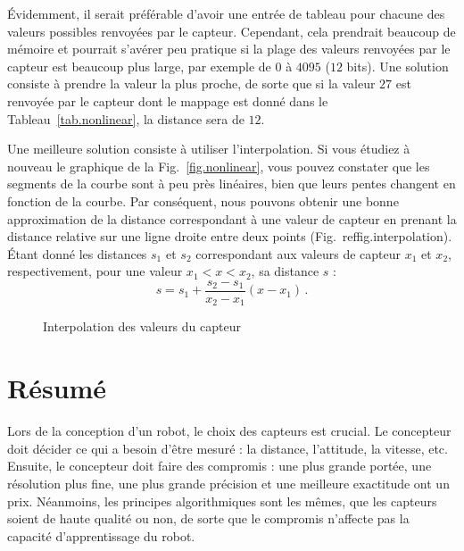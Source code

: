 {Évidemment, il serait préférable d'avoir une entrée de tableau pour chacune des valeurs possibles renvoyées par le capteur. Cependant, cela prendrait beaucoup de mémoire et pourrait s'avérer peu pratique si la plage des valeurs renvoyées par le capteur est beaucoup plus large, par exemple de $0$ à $4095$ ($12$ bits). Une solution consiste à prendre la valeur la plus proche, de sorte que si la valeur $27$ est renvoyée par le capteur dont le mappage est donné dans le Tableau~\ref{tab.nonlinear}, la distance sera de $12$.

Une meilleure solution consiste à utiliser l'interpolation. Si vous étudiez à nouveau le graphique de la Fig.~\ref{fig.nonlinear}, vous pouvez constater que les segments de la courbe sont à peu près linéaires, bien que leurs pentes changent en fonction de la courbe. Par conséquent, nous pouvons obtenir une bonne approximation de la distance correspondant à une valeur de capteur en prenant la distance relative sur une ligne droite entre deux points (Fig.~ref{fig.interpolation}). Étant donné les distances $s_1$ et $s_2$ correspondant aux valeurs de capteur $x_1$ et $x_2$, respectivement, pour une valeur $x_1<x<x_2$, sa distance $s$ :
\[
s = s_1 + \frac{s_2-s_1}{x_2-x_1}(x-x_1)\,.
\]

\begin{figure}
\begin{center}
\caption{Interpolation des valeurs du capteur}\label{fig.interpolation}
\end{center}
\end{figure}

\section{Résumé}

Lors de la conception d'un robot, le choix des capteurs est crucial. Le concepteur doit décider ce qui a besoin d'être mesuré : la distance, l'attitude, la vitesse, etc. Ensuite, le concepteur doit faire des compromis : une plus grande portée, une résolution plus fine, une plus grande précision et une meilleure exactitude ont un prix. Néanmoins, les principes algorithmiques sont les mêmes, que les capteurs soient de haute qualité ou non, de sorte que le compromis n'affecte pas la capacité d'apprentissage du robot.

}
